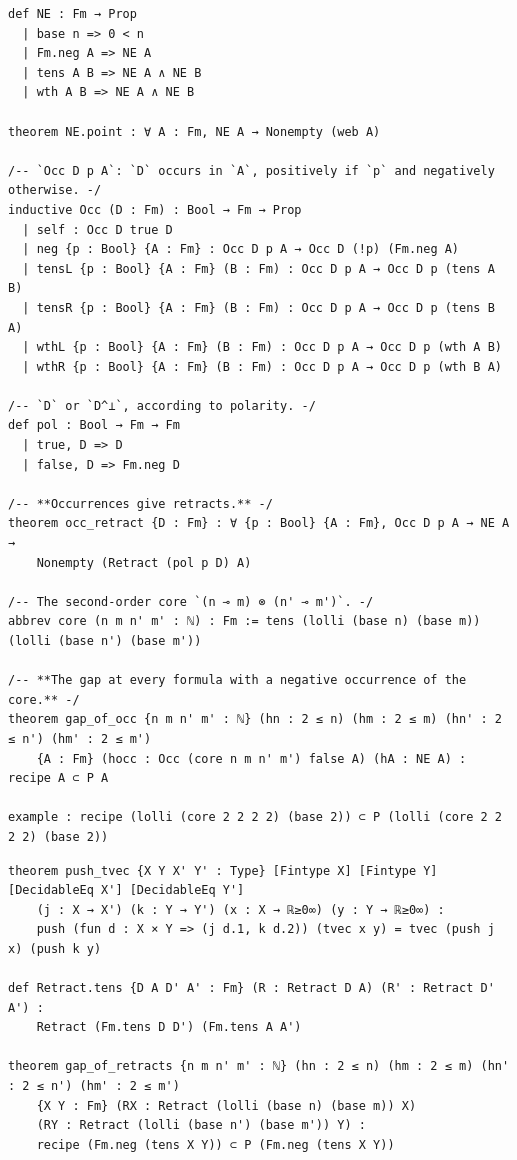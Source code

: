 \begin{lstlisting}
def NE : Fm → Prop
  | base n => 0 < n
  | Fm.neg A => NE A
  | tens A B => NE A ∧ NE B
  | wth A B => NE A ∧ NE B

theorem NE.point : ∀ A : Fm, NE A → Nonempty (web A)

/-- `Occ D p A`: `D` occurs in `A`, positively if `p` and negatively otherwise. -/
inductive Occ (D : Fm) : Bool → Fm → Prop
  | self : Occ D true D
  | neg {p : Bool} {A : Fm} : Occ D p A → Occ D (!p) (Fm.neg A)
  | tensL {p : Bool} {A : Fm} (B : Fm) : Occ D p A → Occ D p (tens A B)
  | tensR {p : Bool} {A : Fm} (B : Fm) : Occ D p A → Occ D p (tens B A)
  | wthL {p : Bool} {A : Fm} (B : Fm) : Occ D p A → Occ D p (wth A B)
  | wthR {p : Bool} {A : Fm} (B : Fm) : Occ D p A → Occ D p (wth B A)

/-- `D` or `D^⊥`, according to polarity. -/
def pol : Bool → Fm → Fm
  | true, D => D
  | false, D => Fm.neg D

/-- **Occurrences give retracts.** -/
theorem occ_retract {D : Fm} : ∀ {p : Bool} {A : Fm}, Occ D p A → NE A →
    Nonempty (Retract (pol p D) A)

/-- The second-order core `(n ⊸ m) ⊗ (n' ⊸ m')`. -/
abbrev core (n m n' m' : ℕ) : Fm := tens (lolli (base n) (base m)) (lolli (base n') (base m'))

/-- **The gap at every formula with a negative occurrence of the core.** -/
theorem gap_of_occ {n m n' m' : ℕ} (hn : 2 ≤ n) (hm : 2 ≤ m) (hn' : 2 ≤ n') (hm' : 2 ≤ m')
    {A : Fm} (hocc : Occ (core n m n' m') false A) (hA : NE A) : recipe A ⊂ P A

example : recipe (lolli (core 2 2 2 2) (base 2)) ⊂ P (lolli (core 2 2 2 2) (base 2))
\end{lstlisting}

\begin{lstlisting}
theorem push_tvec {X Y X' Y' : Type} [Fintype X] [Fintype Y] [DecidableEq X'] [DecidableEq Y']
    (j : X → X') (k : Y → Y') (x : X → ℝ≥0∞) (y : Y → ℝ≥0∞) :
    push (fun d : X × Y => (j d.1, k d.2)) (tvec x y) = tvec (push j x) (push k y)

def Retract.tens {D A D' A' : Fm} (R : Retract D A) (R' : Retract D' A') :
    Retract (Fm.tens D D') (Fm.tens A A')

theorem gap_of_retracts {n m n' m' : ℕ} (hn : 2 ≤ n) (hm : 2 ≤ m) (hn' : 2 ≤ n') (hm' : 2 ≤ m')
    {X Y : Fm} (RX : Retract (lolli (base n) (base m)) X)
    (RY : Retract (lolli (base n') (base m')) Y) :
    recipe (Fm.neg (tens X Y)) ⊂ P (Fm.neg (tens X Y))
\end{lstlisting}


